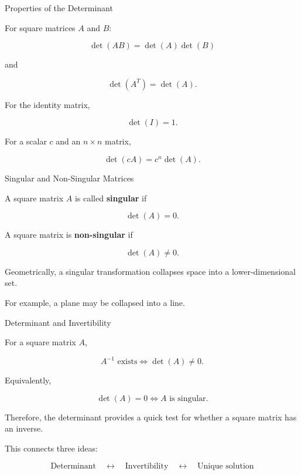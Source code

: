 \begin{frame}{Properties of the Determinant}

For square matrices $A$ and $B$:

\[
\boxed{
\det(AB)=\det(A)\det(B)
}
\]

and

\[
\boxed{
\det(A^T)=\det(A).
}
\]

For the identity matrix,

\[
\boxed{
\det(I)=1.
}
\]

For a scalar $c$ and an $n\times n$ matrix,

\[
\boxed{
\det(cA)=c^n\det(A).
}
\]

\end{frame}



\begin{frame}{Singular and Non-Singular Matrices}

A square matrix $A$ is called \textbf{singular} if

\[
\boxed{
\det(A)=0.
}
\]

A square matrix is \textbf{non-singular} if

\[
\boxed{
\det(A)\neq0.
}
\]

\vspace{0.4cm}

Geometrically, a singular transformation collapses
space into a lower-dimensional set.

\vspace{0.4cm}

For example, a plane may be collapsed into a line.

\end{frame}



\begin{frame}{Determinant and Invertibility}

For a square matrix $A$,

\[
\boxed{
A^{-1}\text{ exists}
\iff
\det(A)\neq0.
}
\]

Equivalently,

\[
\boxed{
\det(A)=0
\iff
A\text{ is singular}.
}
\]

Therefore, the determinant provides a quick test for
whether a square matrix has an inverse.

\vspace{0.4cm}

This connects three ideas:

\[
\boxed{
\text{Determinant}
\quad\longleftrightarrow\quad
\text{Invertibility}
\quad\longleftrightarrow\quad
\text{Unique solution}
}
\]

\end{frame}


